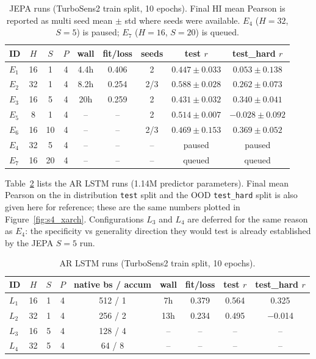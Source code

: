 \begin{table}[h]
\centering
\caption{JEPA runs (TurboSens2 train split, 10 epochs).
Final HI mean Pearson is reported as multi seed mean $\pm$ std where
seeds were available. $E_4$ ($H{=}32$, $S{=}5$) is paused; $E_7$
($H{=}16$, $S{=}20$) is queued.}
\label{tab:runs_jepa}
\small
\begin{tabular}{l c c c c c c c c}
\toprule
ID       & $H$ & $S$ & $P$ & wall & fit/loss & seeds & test $r$ & test\_hard $r$ \\
\midrule
$E_1$    & 16 &  1 & 4 & 4.4h  & 0.406 & 2 & $0.447 \pm 0.033$ & $0.053 \pm 0.138$ \\
$E_2$    & 32 &  1 & 4 & 8.2h  & 0.254 & 2/3 & $0.588 \pm 0.028$ & $0.262 \pm 0.073$ \\
$E_3$    & 16 &  5 & 4 & 20h   & 0.259 & 2 & $0.431 \pm 0.032$ & $0.340 \pm 0.041$ \\
$E_5$    &  8 &  1 & 4 & --    & --    & 2 & $0.514 \pm 0.007$ & $-0.028 \pm 0.092$ \\
$E_6$    & 16 & 10 & 4 & --    & --    & 2/3 & $0.469 \pm 0.153$ & $0.369 \pm 0.052$ \\
$E_4$    & 32 &  5 & 4 & --    & --    & -- & paused & paused \\
$E_7$    & 16 & 20 & 4 & --    & --    & -- & queued & queued \\
\bottomrule
\end{tabular}
\end{table}

Table~\ref{tab:runs_arlstm} lists the AR LSTM runs (1.14M predictor
parameters). Final mean Pearson on the in distribution \texttt{test}
split and the OOD \texttt{test\_hard} split is also given here for
reference; these are the same numbers plotted in
Figure~\ref{fig:s4_xarch}. Configurations $L_3$ and $L_4$ are deferred
for the same reason as $E_4$: the specificity vs generality direction
they would test is already established by the JEPA $S{=}5$ run.

\begin{table}[h]
\centering
\caption{AR LSTM runs (TurboSens2 train split, 10 epochs).}
\label{tab:runs_arlstm}
\small
\begin{tabular}{l c c c c c c c c}
\toprule
ID & $H$ & $S$ & $P$ & native bs / accum & wall & fit/loss & test $r$ & test\_hard $r$ \\
\midrule
$L_1$ & 16 & 1 & 4 & 512 / 1   & 7h    & 0.379 & 0.564  & 0.325 \\
$L_2$ & 32 & 1 & 4 & 256 / 2   & 13h   & 0.234 & 0.495  & $-$0.014 \\
$L_3$ & 16 & 5 & 4 & 128 / 4   & --    & --    & --    & -- \\
$L_4$ & 32 & 5 & 4 & 64 / 8    & --    & --    & --    & -- \\
\bottomrule
\end{tabular}
\end{table}

